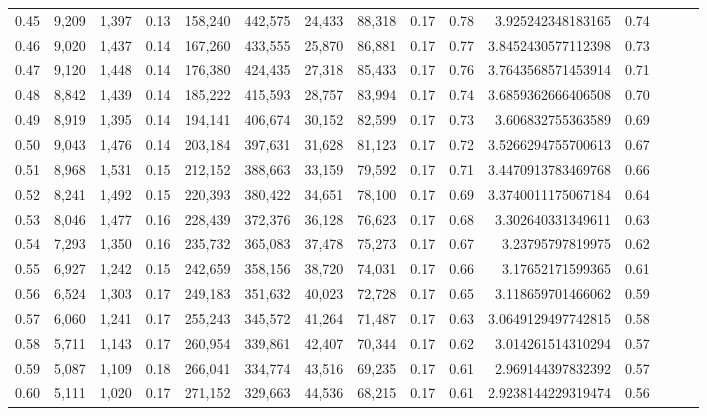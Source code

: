 \begin{tabular}{rrrrrrrrrrrrrrr}
0.45 &   9,209 &  1,397 &  0.13 &  158,240 &  442,575 &   24,433 &   88,318 &  0.17 &  0.78 &     3.925242348183165 &      0.74 \\
0.46 &   9,020 &  1,437 &  0.14 &  167,260 &  433,555 &   25,870 &   86,881 &  0.17 &  0.77 &    3.8452430577112398 &      0.73 \\
0.47 &   9,120 &  1,448 &  0.14 &  176,380 &  424,435 &   27,318 &   85,433 &  0.17 &  0.76 &    3.7643568571453914 &      0.71 \\
0.48 &   8,842 &  1,439 &  0.14 &  185,222 &  415,593 &   28,757 &   83,994 &  0.17 &  0.74 &    3.6859362666406508 &      0.70 \\
0.49 &   8,919 &  1,395 &  0.14 &  194,141 &  406,674 &   30,152 &   82,599 &  0.17 &  0.73 &     3.606832755363589 &      0.69 \\
0.50 &   9,043 &  1,476 &  0.14 &  203,184 &  397,631 &   31,628 &   81,123 &  0.17 &  0.72 &    3.5266294755700613 &      0.67 \\
0.51 &   8,968 &  1,531 &  0.15 &  212,152 &  388,663 &   33,159 &   79,592 &  0.17 &  0.71 &    3.4470913783469768 &      0.66 \\
0.52 &   8,241 &  1,492 &  0.15 &  220,393 &  380,422 &   34,651 &   78,100 &  0.17 &  0.69 &    3.3740011175067184 &      0.64 \\
0.53 &   8,046 &  1,477 &  0.16 &  228,439 &  372,376 &   36,128 &   76,623 &  0.17 &  0.68 &     3.302640331349611 &      0.63 \\
0.54 &   7,293 &  1,350 &  0.16 &  235,732 &  365,083 &   37,478 &   75,273 &  0.17 &  0.67 &      3.23795797819975 &      0.62 \\
0.55 &   6,927 &  1,242 &  0.15 &  242,659 &  358,156 &   38,720 &   74,031 &  0.17 &  0.66 &      3.17652171599365 &      0.61 \\
0.56 &   6,524 &  1,303 &  0.17 &  249,183 &  351,632 &   40,023 &   72,728 &  0.17 &  0.65 &     3.118659701466062 &      0.59 \\
0.57 &   6,060 &  1,241 &  0.17 &  255,243 &  345,572 &   41,264 &   71,487 &  0.17 &  0.63 &    3.0649129497742815 &      0.58 \\
0.58 &   5,711 &  1,143 &  0.17 &  260,954 &  339,861 &   42,407 &   70,344 &  0.17 &  0.62 &     3.014261514310294 &      0.57 \\
0.59 &   5,087 &  1,109 &  0.18 &  266,041 &  334,774 &   43,516 &   69,235 &  0.17 &  0.61 &     2.969144397832392 &      0.57 \\
0.60 &   5,111 &  1,020 &  0.17 &  271,152 &  329,663 &   44,536 &   68,215 &  0.17 &  0.61 &    2.9238144229319474 &      0.56 \\

\end{tabular}
